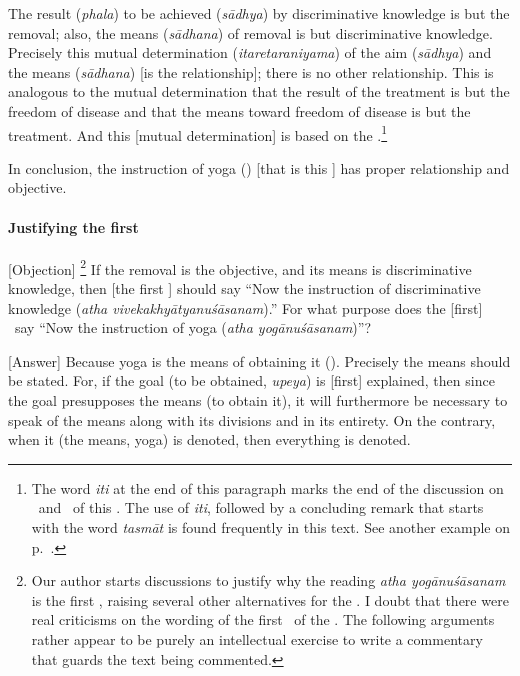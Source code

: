 The%
 result (\emph{phala}) to be achieved (\emph{sādhya}) by discriminative knowledge is but the removal; also, the means (\emph{sādhana}) of removal is but discriminative knowledge.  Precisely this mutual determination (\emph{itaretaraniyama}) of the aim (\emph{sādhya}) and the means (\emph{sādhana}) [is the relationship]; there is no other relationship.  This is analogous to the mutual determination that the result of the treatment is but the freedom of disease and that the means toward freedom of disease is but the treatment.  %
 And this [mutual determination] is based on the \sastra.\footnote{The word \emph{iti} at the end of this paragraph marks the end of the discussion on \prayojana\ and \sambandha\ of this \sastra.  The use of \emph{iti}, followed by a concluding remark that starts with the word \emph{tasmāt} is found frequently in this text.  See another example on p.~\pageref{TSMDTH}.}

In%
 conclusion, the instruction of yoga (\yoganusasana) [that is this \sastra] has proper relationship and objective.

\paragraph{Justifying the first \sutra}
[Objection]%
\footnote{Our author starts discussions to justify why the reading \emph{atha yogānuśāsanam} is the first \sutra, raising several other alternatives for the \sutra.  I doubt that there were real criticisms on the wording of the first \sutra\ of the \PYS.  The following arguments rather appear to be purely an intellectual exercise to write a commentary that guards the text being commented.} If the removal is the
objective, and its means is discriminative knowledge, then [the first \sutra] should say ``Now the instruction
of discriminative knowledge (\emph{atha
  vivekakhyātyanuśāsanam}).''  For what purpose does the [first]
\sutra\ say ``Now the instruction of yoga (\emph{atha
  yogānuśāsanam})''?

[Answer]%
 Because yoga is the means of
obtaining it (\vivekakhyati).  Precisely the means should be
stated.  For, if the goal (to be obtained, \emph{upeya}) is [first] explained, then since the
goal presupposes the means (to obtain it), it will furthermore be
necessary to speak of the means along with its divisions and
in its entirety.  On the contrary, when it (the means, yoga) is denoted,
then everything is denoted.

